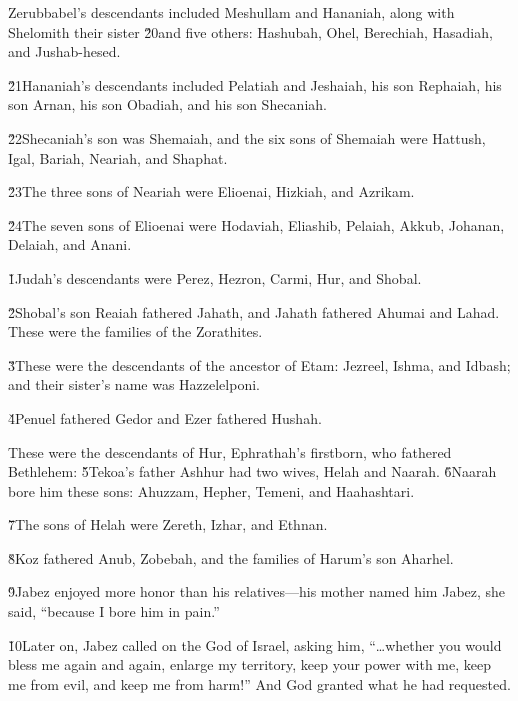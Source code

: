 Zerubbabel's descendants included Meshullam and Hananiah, along with Shelomith their sister \v{20}and five others: Hashubah, Ohel, Berechiah, Hasadiah, and Jushab-hesed.

\v{21}Hananiah's descendants included Pelatiah and Jeshaiah, his son Rephaiah, his son Arnan, his son Obadiah, and his son Shecaniah.

\v{22}Shecaniah's son was Shemaiah, and the six sons of Shemaiah were Hattush, Igal, Bariah, Neariah, and Shaphat.

\v{23}The three sons of Neariah were Elioenai, Hizkiah, and Azrikam.

\v{24}The seven sons of Elioenai were Hodaviah, Eliashib, Pelaiah, Akkub, Johanan, Delaiah, and Anani.

\v{1}Judah's descendants were Perez, Hezron, Carmi, Hur, and Shobal.

\v{2}Shobal's son Reaiah fathered Jahath, and Jahath fathered Ahumai and Lahad. These were the families of the Zorathites.

\v{3}These were the descendants of the ancestor of Etam: Jezreel, Ishma, and Idbash; and their sister's name was Hazzelelponi.

\v{4}Penuel fathered Gedor and Ezer fathered Hushah.

These were the descendants of Hur, Ephrathah's firstborn, who fathered Bethlehem: \v{5}Tekoa's father Ashhur had two wives, Helah and Naarah. \v{6}Naarah bore him these sons: Ahuzzam, Hepher, Temeni, and Haahashtari.

\v{7}The sons of Helah were Zereth, Izhar, and Ethnan.

\v{8}Koz fathered Anub, Zobebah, and the families of Harum's son Aharhel.

\v{9}Jabez enjoyed more honor than his relatives---his mother named him Jabez, she said, ``because I bore him in pain.''

\v{10}Later on, Jabez called on the God of Israel, asking him, ``{\ldots}whether you would bless me again and again, enlarge my territory, keep your power with me, keep me from evil, and keep me from harm!'' And God granted what he had requested.


